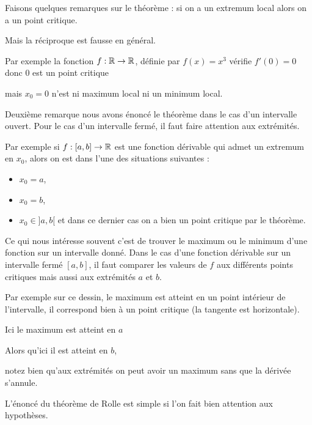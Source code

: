 Faisons quelques remarques sur le théorème : 
si on a un extremum local alors on a un point critique.

Mais la réciproque  est fausse en général.

\change

Par exemple la fonction $f : \mathbb{R} \to \mathbb{R}$, définie par $f(x)= x^3$
vérifie $f'(0)=0$ donc $0$ est un point critique

\change

mais $x_0=0$ n'est ni maximum local ni un minimum local.

\change

Deuxième remarque nous avons énoncé le théorème dans le cas d'un intervalle ouvert.
Pour le cas d'un intervalle fermé, il faut faire attention
aux extrémités.

\change

 Par exemple si $f : [a,b] \to \mathbb{R}$ est une fonction dérivable qui admet un extremum en $x_0$,
alors on est dans l'une des situations suivantes :
\begin{itemize}
  \item $x_0= a$, 
  \item $x_0 =b$,
  \item $x_0 \in ]a,b[$ et dans ce dernier cas on a bien un point critique par le théorème.
\end{itemize}

\change

Ce qui nous intéresse souvent c'est de trouver le maximum ou le minimum d'une fonction sur un intervalle
donné. Dans le cas d'une fonction dérivable sur un intervalle fermé $[a,b]$,
il faut comparer
les valeurs de $f$ aux différents points critiques mais aussi aux extrémités $a$ et $b$.

\change

Par exemple sur ce dessin, le maximum est atteint en un point intérieur de l'intervalle,
il correspond bien à un point critique (la tangente est horizontale).

\change

Ici le maximum est atteint en $a$

\change

Alors qu'ici il est atteint en $b$, 

notez bien qu'aux extrémités on peut avoir un maximum sans que la dérivée s'annule.

\diapo

L'énoncé du théorème de Rolle est simple si l'on fait bien attention aux hypothèses.

